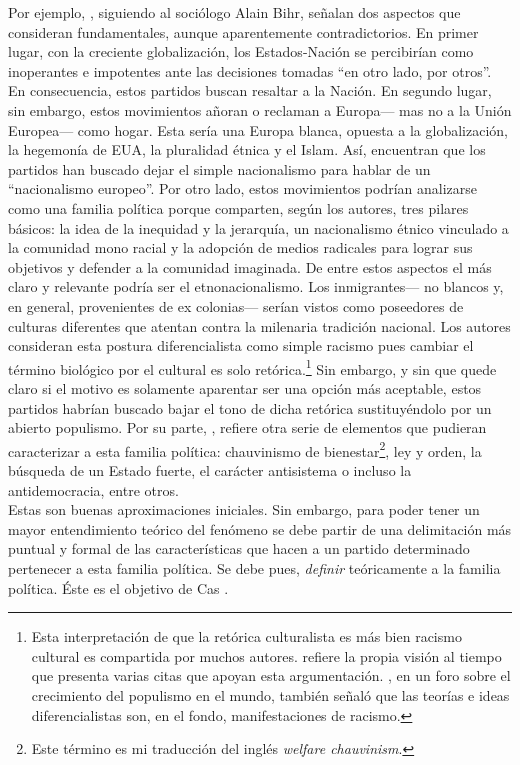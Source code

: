 Por ejemplo, \textcite{Mammone12}, siguiendo al sociólogo Alain Bihr, señalan dos aspectos que consideran fundamentales, aunque aparentemente contradictorios. En primer lugar, con la creciente globalización, los Estados-Nación se percibirían como inoperantes e impotentes ante las decisiones tomadas “en otro lado, por otros”. En consecuencia, estos partidos buscan resaltar a la Nación. En segundo lugar, sin embargo, estos movimientos añoran o reclaman a Europa— mas no a la Unión Europea— como hogar. Esta sería una Europa blanca, opuesta a la globalización, la hegemonía de EUA, la pluralidad étnica y el Islam. Así, \citeauthor{Mammone12} encuentran que los partidos han buscado dejar el simple nacionalismo para hablar de un “nacionalismo europeo”. Por otro lado, estos movimientos podrían analizarse como una familia política porque comparten, según los autores, tres pilares básicos: la idea de la inequidad y la jerarquía, un nacionalismo étnico vinculado a la comunidad mono racial y la adopción de medios radicales para lograr sus objetivos y defender a la comunidad imaginada. De entre estos aspectos el más claro y relevante podría ser el etnonacionalismo. Los inmigrantes--- no blancos y, en general, provenientes de ex colonias--- serían vistos como poseedores de culturas diferentes que atentan contra la milenaria tradición nacional. Los autores consideran esta postura diferencialista como simple racismo pues cambiar el término biológico por el cultural es solo retórica.\footnote{Esta interpretación de que la retórica culturalista es más bien racismo cultural es compartida por muchos autores. \textcite[11-12]{Hainsworth16a} refiere la propia visión al tiempo que presenta varias citas que apoyan esta argumentación. \textcite{Goodliffe17}, en un foro sobre el crecimiento del populismo en el mundo, también señaló que las teorías e ideas diferencialistas son, en el fondo, manifestaciones de racismo.} Sin embargo, y sin que quede claro si el motivo es solamente aparentar ser una opción más aceptable, estos partidos habrían buscado bajar el tono de dicha retórica sustituyéndolo por un abierto populismo. Por su parte, \textcite{Hainsworth16a}, refiere otra serie de elementos que pudieran caracterizar a esta familia política: chauvinismo de bienestar\footnote{Este término es mi traducción del inglés \textit{welfare chauvinism}.}, ley y orden, la búsqueda de un Estado fuerte, el carácter antisistema o incluso la antidemocracia, entre otros.\\

Estas son buenas aproximaciones iniciales. Sin embargo, para poder tener un mayor entendimiento teórico del fenómeno se debe partir de una delimitación más puntual y formal de las características que hacen a un partido determinado pertenecer a esta familia política. Se debe pues, \textit{definir} teóricamente a la familia política. Éste es el objetivo de Cas \textcite{Mudde07a}. 

